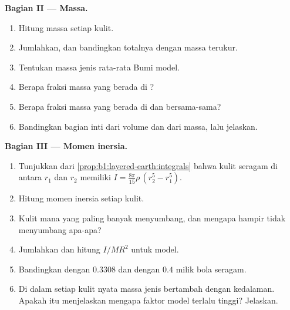 \begin{problem}
\noindent\textbf{Bagian II --- Massa.}
\begin{enumerate}[resume]
  \item Hitung massa setiap kulit.
  \item Jumlahkan, dan bandingkan totalnya dengan massa terukur.
  \item Tentukan massa jenis rata-rata Bumi model.
  \item Berapa fraksi massa yang berada di ?
  \item Berapa fraksi massa yang berada di  dan  bersama-sama?
  \item Bandingkan bagian inti dari volume dan dari massa, lalu jelaskan.
\end{enumerate}

\noindent\textbf{Bagian III --- Momen inersia.}
\begin{enumerate}[resume]
  \item Tunjukkan dari \cref{prop:b1:layered-earth:integrals} bahwa kulit seragam di antara $r_1$ dan $r_2$ memiliki $I = \tfrac{8\pi}{15}\rho\,(r_2^5 - r_1^5)$.
  \item Hitung momen inersia setiap kulit.
  \item Kulit mana yang paling banyak menyumbang, dan mengapa  hampir tidak menyumbang apa-apa?
  \item Jumlahkan dan hitung $I/MR^2$ untuk model.
  \item Bandingkan dengan $0.3308$ dan dengan $0.4$ milik bola seragam.
  \item Di dalam setiap kulit nyata massa jenis bertambah dengan kedalaman. Apakah itu menjelaskan mengapa faktor model terlalu tinggi? Jelaskan.
\end{enumerate}


\end{problem}
